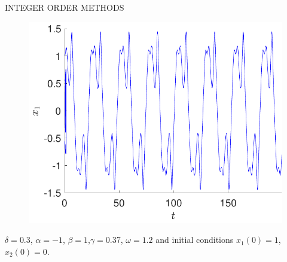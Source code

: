 \begin{frame}{INTEGER ORDER METHODS}
\begin{multicols}{2}
\begin{figure}[H]
            \includegraphics[scale=0.34]{files/Time.pdf}
        \end{figure}
    \end{multicols}
    $\delta=0.3$, $\alpha =-1$, $\beta=1$,$\gamma=0.37$, $\omega =1.2$ and initial conditions $x_1(0)=1$,  $x_2(0)=0$.
\end{frame}



